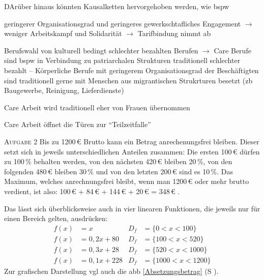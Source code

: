 DArüber hinaus könnten Kausalketten hervorgehoben werden, wie \gls{bspw}
\begin{myitemize}
    \item geringerer Organisationsgrad und geringeres gewerkschtafliches Engagement $\rightarrow$ weniger Arbeitskampf und Solidarität $\rightarrow$ Tarifbindung nimmt ab
    \item Berufswahl von kulturell bedingt schlechter bezahlten Berufen $\rightarrow$ Care Berufe sind \gls{bspw} in Verbindung zu patriarchalen Strukturen traditionell schlechter bezahlt -- Körperliche Berufe mit geringerem Organisationsgrad der Beschäftigten sind traditionell gerne mit Menschen aus migrantischen Strukrturen besetzt (\gls{zb} Baugewerbe, Reinigung, Lieferdienste)
    \item Care Arbeit wird traditionell eher von Frauen übernommen
    \item Care Arbeit öffnet die Türen zur \enquote{Teilzeitfalle}
\end{myitemize}




\textsc{Aufgabe 2} \quad
Bis zu 1200\,€ Brutto kann ein Betrag anrechenungsfrei bleiben. Dieser setzt sich in jeweils unterschiedlichen Anteilen zusammen: Die ersten 100\,€ dürfen zu 100\,\% behalten werden, von den nächsten 420\,€ bleiben 20\,\%, von den folgenden 480\,€ bleiben 30\,\% und von den letzten 200\,€ sind es 10\,\%. Das Maximum, welches anrechnungsfrei bleibt, wenn man 1200\,€ oder mehr brutto verdient, ist also: 100\,€ + 84\,€ + 144\,€ + 20\,€ = 348\,€ \autocite[59-62]{MerkblattSGBII}. 

Das lässt sich überblicksweise auch in vier linearen Funktionen, die jeweils nur für einen Bereich gelten, ausdrücken:
\begin{align} 
f(x)& = x    & 
    D_{f}& = \{0<x<100\}    \\
f(x)& = 0,2x + 80 & 
    D_{f}& = \{100<x<520\}  \\
f(x)& = 0,3x + 28 & 
    D_{f}& = \{520<x<1000\} \\
f(x)& = 0,1x + 228 & 
    D_{f}& = \{1000<x<1200\}
\end{align}
Zur grafischen Darstellung \gls{vgl} auch die \gls{abb} \ref{Absetzungsbetrag} (\gls{S} \pageref{Absetzungsbetrag}).



